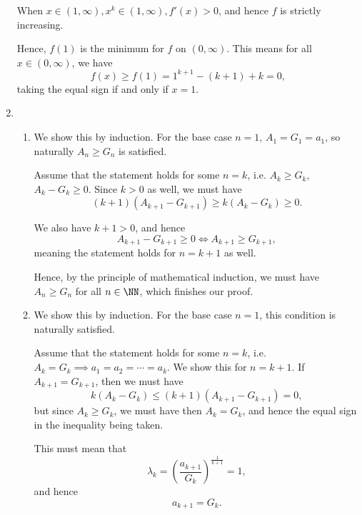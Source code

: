 \begin{enumerate}
          When \(x \in (1, \infty), x^k \in (1, \infty), f'(x) > 0\), and hence \(f\) is strictly increasing.

          Hence, \(f(1)\) is the minimum for \(f\) on \((0, \infty)\). This means for all \(x \in (0, \infty)\), we have
          \[
              f(x) \geq f(1) = 1^{k + 1} - (k + 1) + k = 0,
          \]
          taking the equal sign if and only if \(x = 1\).

    \item \begin{enumerate}
              \item We show this by induction. For the base case \(n = 1\), \(A_1 = G_1 = a_1\), so naturally \(A_n \geq G_n\) is satisfied.

                    Assume that the statement holds for some \(n = k\), i.e. \(A_k \geq G_k\), \(A_k - G_k \geq 0\). Since \(k > 0\) as well, we must have
                    \[
                        (k + 1)(A_{k + 1} - G_{k + 1}) \geq k (A_k - G_k) \geq 0.
                    \]

                    We also have \(k + 1 > 0\), and hence
                    \[
                        A_{k + 1} - G_{k + 1} \geq 0 \iff A_{k + 1} \geq G_{k + 1},
                    \]
                    meaning the statement holds for \(n = k + 1\) as well.

                    Hence, by the principle of mathematical induction, we must have \(A_n \geq G_n\) for all \(n \in \NN\), which finishes our proof.

              \item We show this by induction. For the base case \(n = 1\), this condition is naturally satisfied.

                    Assume that the statement holds for some \(n = k\), i.e. \(A_k = G_k \implies a_1 = a_2 = \cdots = a_k\). We show this for \(n = k + 1\). If \(A_{k + 1} = G_{k + 1}\), then we must have
                    \[
                        k (A_k - G_k) \leq (k + 1)(A_{k + 1} - G_{k + 1}) = 0,
                    \]
                    but since \(A_k \geq G_k\), we must have then \(A_k = G_k\), and hence the equal sign in the inequality being taken.

                    This must mean that
                    \[
                        \lambda_{k} = \left(\frac{a_{k + 1}}{G_k}\right)^{\frac{1}{k + 1}} = 1,
                    \]
                    and hence
                    \[
                        a_{k + 1} = G_k.
                    \]


\end{enumerate}
\end{enumerate}
